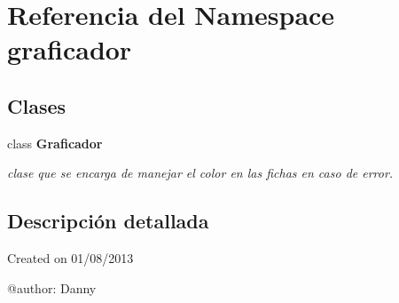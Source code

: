 \section{Referencia del Namespace graficador}
\label{namespacegraficador}
\subsection*{Clases}
\begin{DoxyCompactItemize}
\item 
class {\bf Graficador}
\begin{DoxyCompactList}\small\item\em clase que se encarga de manejar el color en las fichas en caso de error. \end{DoxyCompactList}\end{DoxyCompactItemize}


\subsection{Descripción detallada}
\begin{DoxyVerb}Created on 01/08/2013

@author: Danny
\end{DoxyVerb}
 